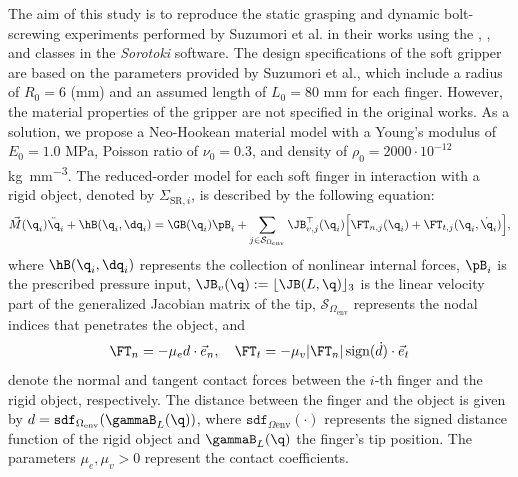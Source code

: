 The aim of this study is to reproduce the static grasping and dynamic bolt-screwing experiments performed by Suzumori et al. in their works \cite{Suzumori1991, Suzumori1992} using the , , and  classes in the \textit{Sorotoki} software. The design specifications of the soft gripper are based on the parameters provided by Suzumori et al., which include a radius of $R_0 = 6$ (\si{\milli \meter}) and an assumed length of $L_0 = 80$ \si{\milli \meter} for each finger. However, the material properties of the gripper are not specified in the original works. As a solution, we propose a Neo-Hookean material model with a Young's modulus of $E_0 = 1.0$ \si{\mega \pascal}, Poisson ratio of $\nu_0 = 0.3$, and density of $\rho_0 = 2000 \cdot 10^{-12}$ \si{\kilo \gram \per \milli \metre \cubed}. The reduced-order model for each soft finger in interaction with a rigid object, denoted by $\Sigma_{\textrm{SR},i}$, is described by the following equation:
%
\begin{multline}
    \vec{M}(\q_i) \ddot{\q}_i  + \hB(\q_i,\dq_i)  =  \GB(\q_i) \pB_i +  \sum_{j\in \mathcal{S}_{\Omega_{\textrm{env}}}} \JB_{v,j}^\top(\q_i) \Big[ \FT_{{n},j}(\q_i) + \FT_{{t,j}}(\q_i,\dot{\q}_i)\Big],
    \label{eq:suzumori_fingermodel_lagrangian}
\end{multline}
%
where $\hB(\q_i,\dq_i)$ represents the collection of nonlinear internal forces, $\pB_i$ is the prescribed pressure input, $\JB_v(\q):= \lfloor\JB(L,\q)\rfloor_3$ is the linear velocity part of the generalized Jacobian matrix of the tip, $\mathcal{S}_{\Omega_{\textrm{env}}}$ represents the nodal indices that penetrates the object, and 
$$\FT_{{n}} = -\mu_e d \cdot \vec{e}_n, \quad \FT_{{t}} = -\mu_v |\FT_{{n}}| \, \textrm{sign}(\dot{d}) \cdot \vec{e}_t$$
denote the normal and tangent contact forces between the $i$-th finger and the rigid object, respectively. The distance between the finger and the object is given by $d = \texttt{sdf}_{\Omega_{\textrm{env}}}(\gammaB_L(\q))$, where $\texttt{sdf}_{\Omega{\textrm{env}}}(\cdot)$ represents the signed distance function of the rigid object and $\gammaB_L(\q)$ the finger's tip position. The parameters $\mu_e, \mu_v > 0$ represent the contact coefficients.

